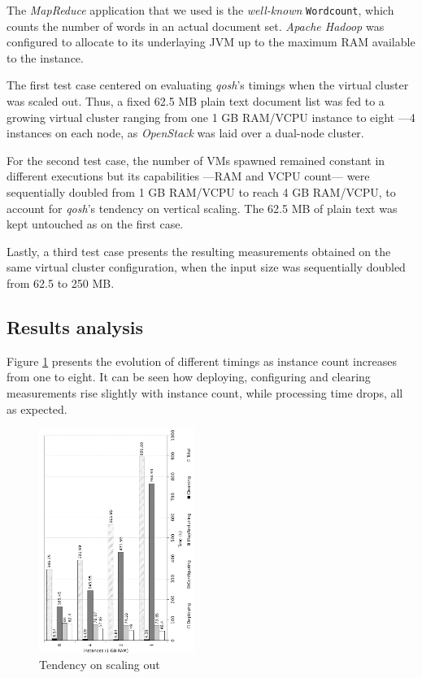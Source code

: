 \documentclass{sig-alternate}
\begin{document}
The \emph{MapReduce} application that we used is the \emph{well-known} \texttt{Wordcount}, which counts the number of words in an actual document set. \emph{Apache Hadoop} was configured to allocate to its underlaying JVM up to the maximum RAM available to the instance.

The first test case centered on evaluating \emph{qosh}'s timings when the virtual cluster was scaled out. Thus, a fixed 62.5 MB plain text document list was fed to a growing virtual cluster ranging from one 1 GB RAM/VCPU instance to eight ---4 instances on each node, as \emph{OpenStack} was laid over a dual-node cluster.

For the second test case, the number of VMs spawned remained constant in different executions but its capabilities ---RAM and VCPU count--- were sequentially doubled from 1 GB RAM/VCPU to reach 4 GB RAM/VCPU, to account for \emph{qosh}'s tendency on vertical scaling. The 62.5 MB of plain text was kept untouched as on the first case.

Lastly, a third test case presents the resulting measurements obtained on the same virtual cluster configuration, when the input size was sequentially doubled from 62.5 to 250 MB.

\subsection{Results analysis}
\noindent Figure \ref{fig:scaleout} presents the evolution of different timings as instance count increases from one to eight. It can be seen how deploying, configuring and clearing measurements rise slightly with instance count, while processing time drops, all as expected.

\begin{figure}[tp]
\centering
\includegraphics[width=0.45\textwidth]{img/007}
\caption{Tendency on scaling out}
\label{fig:scaleout}
\end{figure}
\end{document}
